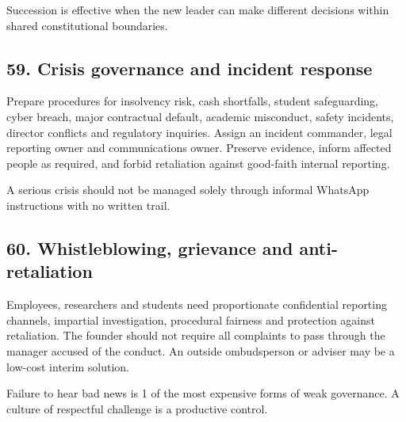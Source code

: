Succession is effective when the new leader can make different decisions within shared constitutional boundaries.

\subsection{59. Crisis governance and incident response}

Prepare procedures for insolvency risk, cash shortfalls, student safeguarding, cyber breach, major contractual default, academic misconduct, safety incidents, director conflicts and regulatory inquiries. Assign an incident commander, legal reporting owner and communications owner. Preserve evidence, inform affected people as required, and forbid retaliation against good-faith internal reporting.

A serious crisis should not be managed solely through informal WhatsApp instructions with no written trail.

\subsection{60. Whistleblowing, grievance and anti-retaliation}

Employees, researchers and students need proportionate confidential reporting channels, impartial investigation, procedural fairness and protection against retaliation. The founder should not require all complaints to pass through the manager accused of the conduct. An outside ombudsperson or adviser may be a low-cost interim solution.

Failure to hear bad news is 1 of the most expensive forms of weak governance. A culture of respectful challenge is a productive control.

